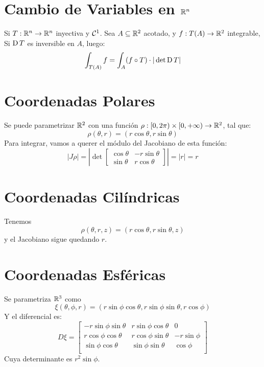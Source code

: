 \documentclass{article}
\begin{document}
    \section*{Cambio de Variables en $\mathbb{R}^n$}
    Si $T : \mathbb{R}^n \to \mathbb{R}^n$ inyectiva y $\mathcal{C}^1$. Sea $A \subseteq \mathbb{R}^2$ acotado, y $f : T(A) \to \mathbb{R}^2$ integrable, Si $\operatorname{D} T$ es inversible en $A$, luego:
    \[
        \int_{T(A)} f = \int_{A} (f \circ T) \cdot |\det \operatorname{D} T|
    \]
    \section*{Coordenadas Polares}
    Se puede parametrizar $\mathbb{R}^2$ con una función $\rho : [0, 2\pi) \times [0, +\infty) \to \mathbb{R}^2$, tal que:
    \[
        \rho(\theta, r) = (r \cos \theta, r \sin \theta)
    \]
    Para integrar, vamos a querer el módulo del Jacobiano de esta función:
    \[
        |J\rho| = \left| \det
        \begin{bmatrix}
            \cos \theta & -r\sin \theta \\
            \sin \theta & r \cos \theta
        \end{bmatrix}\right| = |r| = r
    \]
    \section*{Coordenadas Cilíndricas}
    Tenemos
    \[
        \rho(\theta, r, z) = (r \cos \theta, r \sin \theta, z)
    \]
    y el Jacobiano sigue quedando $r$.
    \section*{Coordenadas Esféricas}
    Se parametriza $\mathbb{R}^3$ como
    \[\xi(\theta, \phi, r) = (r \sin \phi \cos \theta, r \sin \phi \sin \theta, r \cos \phi)\]
    Y el diferencial es:
    \[
        D \xi =
        \begin{bmatrix}
            - r \sin \phi \sin \theta & r \sin \phi \cos \theta & 0 \\
            r \cos \phi \cos \theta & r \cos \phi \sin \theta & -r\sin \phi \\
            \sin \phi \cos \theta & \sin \phi \sin \theta & \cos \phi \\
        \end{bmatrix}
    \]
    Cuya determinante es $r^2 \sin \phi$.
\end{document}

